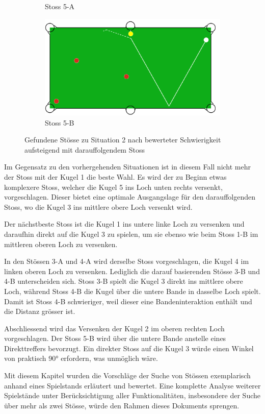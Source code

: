 \begin{figure}[h!]
\begin{subfigure}[b]{0.4\textwidth}
        \caption{Stoss 5-A}
        \label{fig:situation_2_solution_5a}
    \end{subfigure}
    \hfill
    \begin{subfigure}[b]{0.4\textwidth}
        \centering
        \includegraphics[width=1.0\linewidth]{../common/04_results/resources/simple_search/situation_diverse_solution_deep_search_5b.PNG}
        \caption{Stoss 5-B}
        \label{fig:situation_2_solution_5b}
    \end{subfigure}
    \caption{Gefundene Stösse zu Situation 2 nach bewerteter Schwierigkeit aufsteigend mit darauffolgendem Stoss}
    \label{fig:situation_2_solutions}
\end{figure}

Im Gegensatz zu den vorhergehenden Situationen ist in diesem Fall nicht mehr der Stoss mit der Kugel 1
die beste Wahl. Es wird der zu Beginn etwas komplexere Stoss, welcher die Kugel 5 ins Loch unten
rechts versenkt, vorgeschlagen. Dieser bietet eine optimale Ausgangslage für den darauffolgenden Stoss,
wo die Kugel 3 ins mittlere obere Loch versenkt wird.

Der nächstbeste Stoss ist die Kugel 1 ins untere linke Loch zu versenken und
daraufhin direkt auf die Kugel 3 zu spielen, um sie ebenso wie beim Stoss 1-B im mittleren oberen Loch zu versenken.

In den Stössen 3-A und 4-A wird derselbe Stoss vorgeschlagen, die Kugel 4 im linken oberen Loch zu versenken.
Lediglich die darauf basierenden Stösse 3-B und 4-B unterscheiden sich.
Stoss 3-B spielt die Kugel 3 direkt ins mittlere obere Loch, während Stoss 4-B die Kugel über die untere Bande in dasselbe Loch spielt.
Damit ist Stoss 4-B schwieriger, weil dieser eine Bandeninteraktion enthält und die Distanz grösser ist.

Abschliessend wird das Versenken der Kugel 2 im oberen rechten Loch vorgeschlagen.
Der Stoss 5-B wird über die untere Bande anstelle eines Direkttreffers bevorzugt.
Ein direkter Stoss auf die Kugel 3 würde einen Winkel von praktisch \ang{90} erfordern, was unmöglich wäre.

Mit diesem Kapitel wurden die Vorschläge der Suche von Stössen exemplarisch anhand eines Spielstands erläutert und bewertet.
Eine komplette Analyse weiterer Spielstände unter Berücksichtigung aller Funktionalitäten,
insbesondere der Suche über mehr als zwei Stösse, würde den Rahmen dieses Dokuments sprengen.

